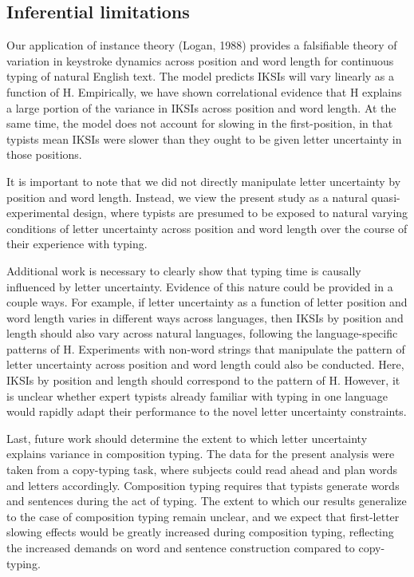 \documentclass[,man,floatsintext]{apa6}
\begin{document}
\hypertarget{inferential-limitations}{%
\subsection{Inferential limitations}\label{inferential-limitations}}

Our application of instance theory (Logan, 1988) provides a falsifiable theory of variation in keystroke dynamics across position and word length for continuous typing of natural English text. The model predicts IKSIs will vary linearly as a function of H. Empirically, we have shown correlational evidence that H explains a large portion of the variance in IKSIs across position and word length. At the same time, the model does not account for slowing in the first-position, in that typists mean IKSIs were slower than they ought to be given letter uncertainty in those positions.

It is important to note that we did not directly manipulate letter uncertainty by position and word length. Instead, we view the present study as a natural quasi-experimental design, where typists are presumed to be exposed to natural varying conditions of letter uncertainty across position and word length over the course of their experience with typing.

Additional work is necessary to clearly show that typing time is causally influenced by letter uncertainty. Evidence of this nature could be provided in a couple ways. For example, if letter uncertainty as a function of letter position and word length varies in different ways across languages, then IKSIs by position and length should also vary across natural languages, following the language-specific patterns of H. Experiments with non-word strings that manipulate the pattern of letter uncertainty across position and word length could also be conducted. Here, IKSIs by position and length should correspond to the pattern of H. However, it is unclear whether expert typists already familiar with typing in one language would rapidly adapt their performance to the novel letter uncertainty constraints.

Last, future work should determine the extent to which letter uncertainty explains variance in composition typing. The data for the present analysis were taken from a copy-typing task, where subjects could read ahead and plan words and letters accordingly. Composition typing requires that typists generate words and sentences during the act of typing. The extent to which our results generalize to the case of composition typing remain unclear, and we expect that first-letter slowing effects would be greatly increased during composition typing, reflecting the increased demands on word and sentence construction compared to copy-typing.
\end{document}
